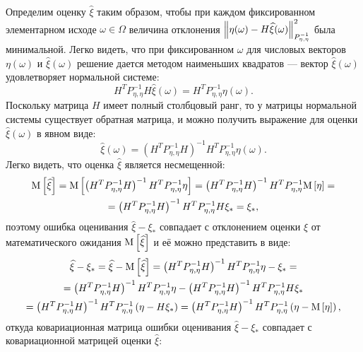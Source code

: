 Определим оценку $\widehat{\xi}$ таким образом, чтобы при каждом фиксированном элементарном исходе $\omega \in \Omega$ величина отклонения
$\left \| \eta(\omega) - H \widehat{\xi}(\omega) \right \|_{P_{\eta, \eta}^{-1}}^2$ была минимальной. Легко видеть, что при фиксированном $\omega$ для числовых векторов
$\eta(\omega)$ и $\widehat{\xi}(\omega)$ решение дается методом наименьших квадратов --- вектор $\widehat{\xi}(\omega)$ удовлетворяет нормальной системе:
$$
	H^T P_{\eta, \eta}^{-1} H \widehat{\xi}(\omega) = H^T P_{\eta, \eta}^{-1} \eta(\omega) . 
$$
Поскольку матрица $H$ имеет полный столбцовый ранг, то у матрицы нормальной системы существует обратная матрица, и можно получить выражение для оценки
$\widehat{\xi}(\omega)$ в явном виде:
\begin{equation} \label{equation:filtering:in_observations:static:estimate}
	\widehat{\xi}(\omega) = \left ( H^T P_{\eta, \eta}^{-1} H \right )^{-1} H^T P_{\eta, \eta}^{-1} \eta(\omega) . 
\end{equation}
Легко видеть, что оценка $\widehat{\xi}$ является несмещенной:
\begin{multline*}
	\mathrm{M} \left [ \widehat{\xi} \right ]
	= \mathrm{M} \left [ \left ( H^T P_{\eta, \eta}^{-1} H \right )^{-1} H^T P_{\eta, \eta}^{-1} \eta \right ]
	= \left ( H^T P_{\eta, \eta}^{-1} H \right )^{-1} H^T P_{\eta, \eta}^{-1} \mathrm{M} \left [ \eta \right ] = \\
	= \left ( H^T P_{\eta, \eta}^{-1} H \right )^{-1} H^T P_{\eta, \eta}^{-1} H \xi_*
	= \xi_*
	,
\end{multline*}
поэтому ошибка оценивания $\widehat{\xi} - \xi_*$ совпадает с отклонением оценки $\widehat{\xi}$ от математического ожидания $\mathrm{M} \left [ \widehat{\xi} \right ]$
и её можно представить в виде:
\begin{multline*}
	\widehat{\xi} - \xi_*
	= \widehat{\xi} - \mathrm{M} \left [ \widehat{\xi} \right ]
	= \left ( H^T P_{\eta, \eta}^{-1} H \right )^{-1} H^T P_{\eta, \eta}^{-1} \eta - \xi_* = \\
	= \left ( H^T P_{\eta, \eta}^{-1} H \right )^{-1} H^T P_{\eta, \eta}^{-1} \eta - \left ( H^T P_{\eta, \eta}^{-1} H \right )^{-1} H^T P_{\eta, \eta}^{-1} H \xi_* \\
	= \left ( H^T P_{\eta, \eta}^{-1} H \right )^{-1} H^T P_{\eta, \eta}^{-1} \left ( \eta - H \xi_* \right )
	= \left ( H^T P_{\eta, \eta}^{-1} H \right )^{-1} H^T P_{\eta, \eta}^{-1} \left ( \eta - \mathrm{M} \left [ \eta \right ] \right ) ,
\end{multline*}
откуда ковариационная матрица ошибки оценивания $\widehat{\xi} - \xi_*$ совпадает с ковариационной матрицей оценки $\widehat{\xi}$:
